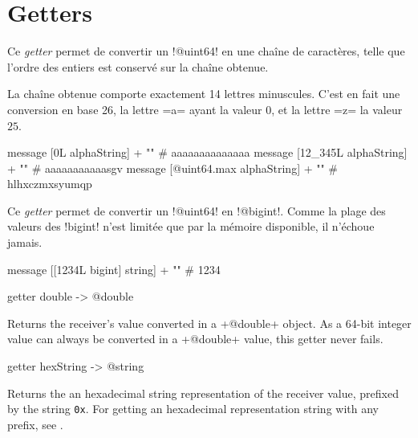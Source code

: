 \section{Getters}



Ce \emph{getter} permet de convertir un \ggs!@uint64! en une chaîne de caractères, telle que l'ordre des entiers est conservé sur la chaîne obtenue.

La chaîne obtenue comporte exactement 14 lettres minuscules. C'est en fait une conversion en base 26, la lettre \ggs=a= ayant la valeur $0$, et la lettre \ggs=z= la valeur $25$.


\begin{galgas}
  message [0L alphaString] + "\n"          # aaaaaaaaaaaaaa
  message [12_345L alphaString] + "\n"     # aaaaaaaaaaasgv
  message [@uint64.max alphaString] + "\n" # hlhxczmxsyumqp
\end{galgas}


Ce \emph{getter} permet de convertir un \ggs!@uint64! en \ggs!@bigint!. Comme la plage des valeurs des \ggs!bigint! n'est limitée que par la mémoire disponible, il n'échoue jamais.

\begin{galgas}
  message [[1234L bigint] string] + "\n" # 1234
\end{galgas}



\begin{galgas}
getter double -> @double
\end{galgas}

Returns the receiver's value converted in a \ggs+@double+ object. As a 64-bit integer value can always be converted in a \ggs+@double+ value, this getter never fails.





\begin{galgas}
getter hexString -> @string
\end{galgas}

Returns the an hexadecimal string representation of the receiver value, prefixed by the string \texttt{0x}. For getting an hexadecimal representation string with any prefix, see .






